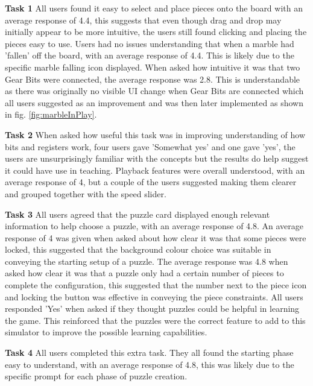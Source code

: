\documentclass{l4proj}
\begin{document}
\textbf{Task 1}
All users found it easy to select and place pieces onto the board with an average response of 4.4, this suggests that even though drag and drop may initially appear to be more intuitive, the users still found clicking and placing the pieces easy to use. Users had no issues understanding that when a marble had 'fallen' off the board, with an average response of 4.4. This is likely due to the specific marble falling icon displayed. When asked how intuitive it was that two Gear Bits were connected, the average response was 2.8. This is understandable as there was originally no visible UI change when Gear Bits are connected which all users suggested as an improvement and was then later implemented as shown in fig. \ref{fig:marbleInPlay}. 

\textbf{Task 2}
When asked how useful this task was in improving understanding of how bits and registers work, four users gave 'Somewhat yes' and one gave 'yes', the users are unsurprisingly familiar with the concepts but the results do help suggest it could have use in teaching. Playback features were overall understood, with an average response of 4, but a couple of the users suggested making them clearer and grouped together with the speed slider. 

\textbf{Task 3}
All users agreed that the puzzle card displayed enough relevant information to help choose a puzzle, with an average response of 4.8. An average response of 4 was given when asked about how clear it was that some pieces were locked, this suggested that the background colour choice was suitable in conveying the starting setup of a puzzle. The average response was 4.8 when asked how clear it was that a puzzle only had a certain number of pieces to complete the configuration, this suggested that the number next to the piece icon and locking the button was effective in conveying the piece constraints. All users responded 'Yes' when asked if they thought puzzles could be helpful in learning the game. This reinforced that the puzzles were the correct feature to add to this simulator to improve the possible learning capabilities.

\textbf{Task 4}
All users completed this extra task. They all found the starting phase easy to understand, with an average response of 4.8, this was likely due to the specific prompt for each phase of puzzle creation.  
\end{document}

